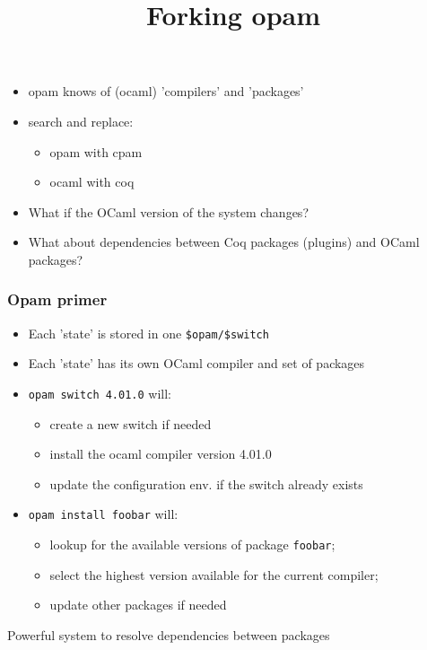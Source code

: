 \documentclass[9pt]{beamer}
\begin{document}
\begin{frame}
  \title{Forking opam}
  \begin{itemize}
  \item opam knows of (ocaml) \alert{'compilers'} and 'packages'
    \pause
  \item search and replace:
    \begin{itemize}
    \item opam with cpam
    \item ocaml with coq
    \end{itemize}
    \pause
  \item What if the OCaml version of the system changes?
  \item What about dependencies between Coq packages (plugins) and OCaml  packages?
  \end{itemize}
\end{frame}



\begin{frame}[fragile]
  \frametitle{Opam primer}
  \begin{itemize}
  \item Each 'state' is stored in one {\verb!$opam/$switch!}
  \item Each 'state' has its own OCaml compiler and set of packages
  \item {\tt opam switch 4.01.0} will:
    \begin{itemize}
    \item create a new switch if needed
    \item install the ocaml compiler version 4.01.0
      \pause
    \item update the configuration env. if the switch already exists
    \end{itemize}
    \pause
  \item {\tt opam install foobar} will:
    \begin{itemize}
    \item lookup for the available versions of package {\tt foobar};
    \item select the highest version available for the current compiler; 
    \item update other packages if needed
    \end{itemize}
  \end{itemize}
  
  \pause
  
  \begin{center}
    Powerful system to resolve dependencies between packages
  \end{center}
\end{frame}
\end{document}
